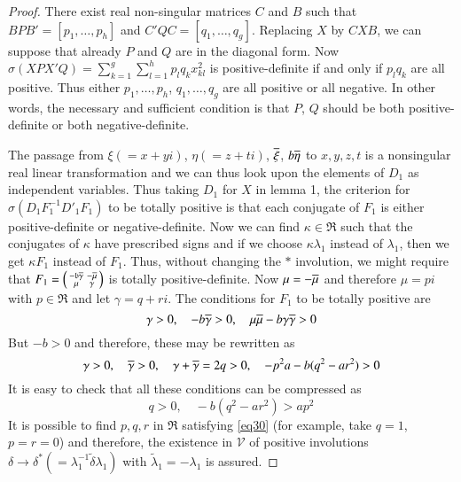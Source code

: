 \begin{proof}
There \pageoriginale exist real non-singular matrices $C$ and $B$ such
that $B P B' = [p_1, \ldots, p_h]$ and $C' Q C =[q_1,\ldots,
  q_g]$. Replacing $X$ by $C X B$, we can suppose that already $P$
and $Q$ are in the diagonal form. Now\break $\sigma (X P X' Q) =
\sum\limits^g_{k=1} \sum\limits^h_{l=1} p_l q_k x^2_{kl}$ is positive-definite if
and only if $p_l q_k$ are all positive. Thus either $p_1,\ldots, p_h$,
$q_1,\ldots, q_g$ are all positive or all negative. In other words,
the necessary and sufficient condition is that $P$, $Q$ should be both
positive-definite or both negative-definite.

The passage from $\xi(=x+yi)$, $\eta (=z + ti)$, $\overline{\xi}$,
$b\overline{\eta}$ to $x, y, z, t$ is a nonsingular real linear
transformation and we can thus look upon the elements of $D_1$ as
independent variables. Thus taking $D_1$ for $X$ in lemma 1, the
criterion for $\sigma (D_1 F^{-1}_1 D'_1 F_1)$ to be totally positive
is that each conjugate of $F_1$ is either positive-definite or
negative-definite. Now we can find $\kappa \in \mathfrak{R}$ such that
the conjugates of $\kappa$ have prescribed signs and if we choose
$\kappa \lambda_1$ instead of $\lambda_1$, then we get $\kappa F_1$
instead of $F_1$. Thus, without changing the $\ast$ involution, we
might require that $F_1 = \left(\begin{smallmatrix} -\mathfrak{b}
  \overline{\gamma} & - \overline{\mu}\\ \mu & \gamma \end{smallmatrix}\right)$ is
totally positive-definite. Now $\mu = -\overline{\mu}$ and therefore $\mu =
p i$ with $p \in \mathfrak{R}$ and let $\gamma = q + r i$. The
conditions for $F_1$ to be totally positive are 
$$
\gamma > 0 , \quad -b \overline{\gamma} > 0, \quad \mu \overline{\mu} - b \gamma 
\overline{\gamma} > 0
$$
But $-b >0$ and therefore, these may be rewritten as
$$
\gamma >0, \quad \overline{\gamma} >0, \quad \gamma + \overline{\gamma} = 2q >0, \quad
-p^2 a - b(q^2-ar^2)>0
$$
It is easy to check that all these conditions can be compressed as 
\begin{equation*}
q > 0, \quad -b(q^2-ar^2) > a p^2 \tag{30}\label{eq30}
\end{equation*}\pageoriginale
It is possible to find $p,q,r$ in $\mathfrak{R}$ satisfying \eqref{eq30} (for
example, take $q=1$, $p=r=0$) and therefore, the existence in
$\mathscr{V}$ of positive involutions $\delta \rightarrow
\delta^{\ast}(= \lambda^{-1}_1 \widetilde{\delta} \lambda_1)$ with
$\widetilde{\lambda}_1 =- \lambda_1$ is assured.


\end{proof}
